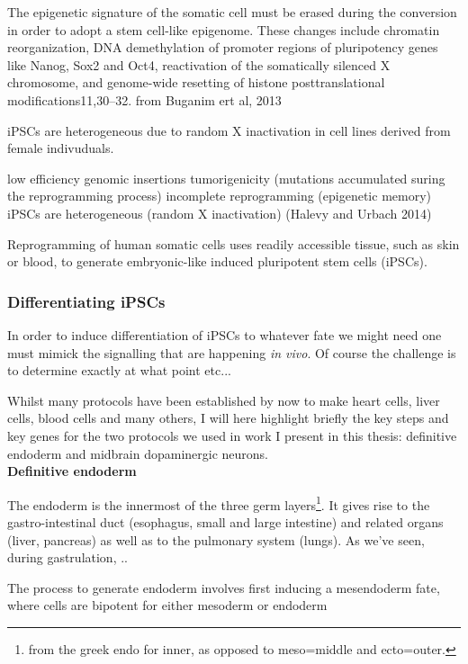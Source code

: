 The epigenetic signature of the somatic cell must be erased during the conversion in order to adopt a stem cell-like epigenome. These changes include chromatin reorganization, DNA demethylation of promoter regions of pluripotency genes like Nanog, Sox2 and Oct4, reactivation of the somatically silenced X chromosome, and genome-wide resetting of histone posttranslational modifications11,30–32.
from Buganim ert al, 2013 \cite{buganim2013mechanisms}

iPSCs are heterogeneous due to random X inactivation in cell lines derived from female indivuduals.



low efficiency
genomic insertions
tumorigenicity 
(mutations accumulated suring the reprogramming process)
incomplete reprogramming (epigenetic memory)
iPSCs are heterogeneous (random X inactivation)
\cite{halevy2014comparing} (Halevy and Urbach 2014)

\cite{park2008reprogramming}

Reprogramming of human somatic cells uses readily accessible tissue, such as skin or blood, to generate embryonic-like induced pluripotent stem cells (iPSCs). \cite{saha2009technical}

\subsubsection{Differentiating iPSCs}

In order to induce differentiation of iPSCs to whatever fate we might need one must mimick the signalling that are happening \textit{in vivo}.
Of course the challenge is to determine exactly at what point etc...

Whilst many protocols have been established by now to make heart cells, liver cells, blood cells and many others, I will here highlight briefly the key steps and key genes for the two protocols we used in work I present in this thesis: definitive endoderm and midbrain dopaminergic neurons.\\

\textbf{Definitive endoderm}

The endoderm is the innermost of the three germ layers\footnote{from the greek endo for inner, as opposed to meso=middle and ecto=outer.}.
It gives rise to the gastro-intestinal duct (esophagus, small and large intestine) and related organs (liver, pancreas) as well as to the pulmonary system (lungs).
As we've seen, during gastrulation, ..

The process to generate endoderm involves first inducing a mesendoderm fate, where cells are bipotent for either mesoderm or endoderm

